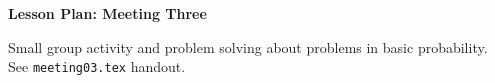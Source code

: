 \documentclass[12pt]{amsart}
\theoremstyle{definition}
\begin{document}
\begin{center}
\textbf{\Huge
Lesson Plan: Meeting Three
}
\end{center}
\vspace{.5in}

Small group activity and problem solving about problems in basic probability. See \texttt{meeting03.tex} handout.
\end{document}

